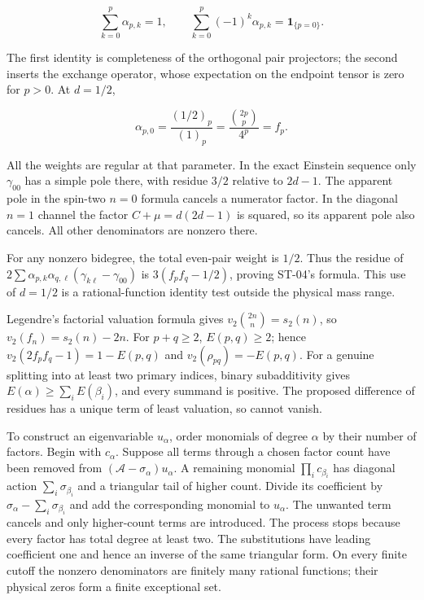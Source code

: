 \[
\sum_{k=0}^p\alpha_{p,k}=1,\qquad
\sum_{k=0}^p(-1)^k\alpha_{p,k}=\mathbf1_{\{p=0\}}.
\]

The first identity is completeness of the orthogonal pair projectors; the second inserts the exchange operator, whose expectation on the endpoint tensor is zero for \(p>0\). At \(d=1/2\),

\[
\alpha_{p,0}=\frac{(1/2)_p}{(1)_p}
=\frac{\binom{2p}{p}}{4^p}=f_p.
\]

All the weights are regular at that parameter. In the exact Einstein sequence only \(\gamma_{00}\) has a simple pole there, with residue \(3/2\) relative to \(2d-1\). The apparent pole in the spin-two \(n=0\) formula cancels a numerator factor. In the diagonal \(n=1\) channel the factor \(C+\mu=d(2d-1)\) is squared, so its apparent pole also cancels. All other denominators are nonzero there.

For any nonzero bidegree, the total even-pair weight is \(1/2\). Thus the residue of \(2\sum\alpha_{p,k}\alpha_{q,\ell}(\gamma_{k\ell}-\gamma_{00})\) is \(3(f_pf_q-1/2)\), proving ST-04's formula. This use of \(d=1/2\) is a rational-function identity test outside the physical mass range.

Legendre's factorial valuation formula gives \(v_2\binom{2n}{n}=s_2(n)\), so \(v_2(f_n)=s_2(n)-2n\). For \(p+q\geq2\), \(E(p,q)\geq2\); hence \(v_2(2f_pf_q-1)=1-E(p,q)\) and \(v_2(\rho_{pq})=-E(p,q)\). For a genuine splitting into at least two primary indices, binary subadditivity gives \(E(\alpha)\geq\sum_iE(\beta_i)\), and every summand is positive. The proposed difference of residues has a unique term of least valuation, so cannot vanish.

To construct an eigenvariable \(u_\alpha\), order monomials of degree \(\alpha\) by their number of factors. Begin with \(c_\alpha\). Suppose all terms through a chosen factor count have been removed from \((\mathscr A-\sigma_\alpha)u_\alpha\). A remaining monomial \(\prod_i c_{\beta_i}\) has diagonal action \(\sum_i\sigma_{\beta_i}\) and a triangular tail of higher count. Divide its coefficient by \(\sigma_\alpha-\sum_i\sigma_{\beta_i}\) and add the corresponding monomial to \(u_\alpha\). The unwanted term cancels and only higher-count terms are introduced. The process stops because every factor has total degree at least two. The substitutions have leading coefficient one and hence an inverse of the same triangular form. On every finite cutoff the nonzero denominators are finitely many rational functions; their physical zeros form a finite exceptional set.

